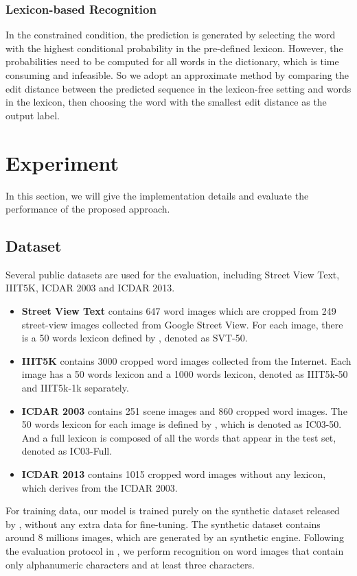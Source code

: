 \documentclass[letterpaper]{article} %
\begin{document}
\subsubsection{Lexicon-based Recognition}

In the constrained condition, the prediction is generated by selecting the word with the highest conditional probability in the pre-defined lexicon. However, the probabilities need to be computed for all words in the dictionary, which is time consuming and infeasible. So we adopt an approximate method by comparing the edit distance between the predicted sequence in the lexicon-free setting and words in the lexicon, then choosing the word with the smallest edit distance as the output label.

\section{Experiment}
In this section, we will give the implementation details and evaluate the performance of the proposed approach.

\subsection{Dataset}
Several public datasets are used for the evaluation, including Street View Text, IIIT5K, ICDAR 2003 and ICDAR 2013.
\begin{itemize}
\item \textbf{Street View Text} \cite{wang2011end} contains 647 word images which are cropped from 249 street-view images collected from Google Street View. For each image, there is a 50 words lexicon defined by \cite{wang2011end}, denoted as SVT-50.
\item \textbf{IIIT5K} \cite{mishra2012scene} contains 3000 cropped word images collected from the Internet. Each image has a 50 words lexicon and a 1000 words lexicon, denoted as IIIT5k-50 and IIIT5k-1k separately.
\item \textbf{ICDAR 2003} \cite{lucas2005icdar} contains 251 scene images and 860 cropped word images. The 50 words lexicon for each image is defined by \cite{wang2011end}, which is denoted as IC03-50. And a full lexicon is composed of all the words that appear in the test set, denoted as IC03-Full.
\item \textbf{ICDAR 2013} \cite{karatzas2013icdar} contains 1015 cropped word images without any lexicon, which derives from the ICDAR 2003.
\end{itemize}
For training data, our model is trained purely on the synthetic dataset released by \cite{jaderberg2014synthetic}, without any extra data for fine-tuning. The synthetic dataset contains around 8 millions images, which are generated by an synthetic engine. Following the evaluation protocol in \cite{wang2011end}, we perform recognition on word images that contain only alphanumeric characters and at least three characters.
\end{document}
